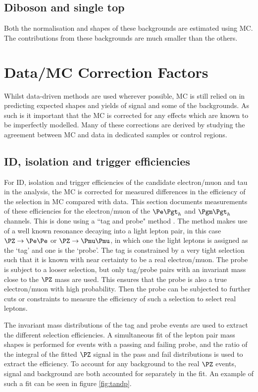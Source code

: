 \subsection{Diboson and single top}
Both the normalisation and shapes of these backgrounds are estimated using \ac{MC}.
The contributions from these backgrounds are much smaller than the others.

\section{Data/MC Correction Factors}
\label{sec:datamcfactors}

Whilst data-driven methods are used wherever possible, \ac{MC} is still
relied on in predicting expected shapes and yields of signal and some of the
backgrounds. As such is it important that the \ac{MC} is corrected for
any effects which are known to be imperfectly modelled. Many of these corrections
are derived by studying the agreement between \ac{MC} and data in dedicated
samples or control regions.

\subsection{ID, isolation and trigger efficiencies}
\label{sec:idisotrigger}

For ID, isolation and trigger efficiencies of the candidate electron/muon 
and tau in the analysis, the \ac{MC} is corrected for measured differences in 
the efficiency of the selection in \ac{MC} compared with data. 
This section documents measurements of these efficiencies for the electron/muon 
of the $\etau$ and $\mutau$ channels. This is done using a ``tag and probe"
method \cite{Khachatryan:2010xn}.
The method makes use of a well known resonance decaying
into a light lepton pair, in this case $\PZ\to\Pe\Pe$ or $\PZ\to\Pmu\Pmu$, 
in which one the light leptons is assigned as the `tag' and one is the `probe'. 
The tag is constrained by a very tight selection such that it is known with near 
certainty to be a real electron/muon. The probe is subject to a looser selection, 
but only tag/probe pairs with an invariant mass close to the $\PZ$ mass are used. 
This ensures that the probe is also a true electron/muon with high probability. 
Then the probe can be subjected to further cuts or constraints to measure the 
efficiency of such a selection to select real leptons.

The invariant mass distributions of the tag and probe events are used to extract
the different selection efficiencies. A simultaneous fit of the lepton pair mass
shapes is performed for events with a passing and failing probe, 
and the ratio of the integral of the fitted $\PZ$ signal 
in the pass and fail distributions is used to extract the efficiency. To account for any background
to the real $\PZ$ events, signal and background are both accounted for
separately in the fit. An example of such a fit can be seen in figure
\ref{fig:tandp}.

